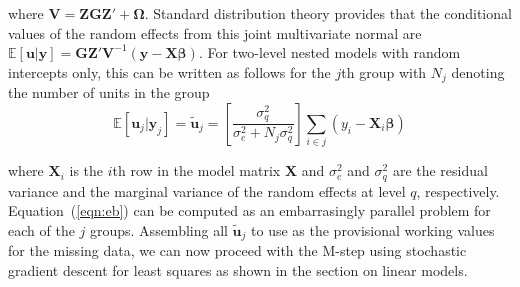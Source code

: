 \documentclass[12pt]{article}
\begin{document}
\noindent where $\bm{V} = \bm{ZGZ'} + \bm{\Omega}$. Standard distribution theory provides that the conditional values of the random effects from this joint multivariate normal are $\mathbb{E}[\bm{u}|\bm{y}]  = \bm{GZ'V}^{-1}(\bm{y}-\bm{X\beta})$. For two-level nested models with random intercepts only, this can be written as follows for the $j$th group with $N_j$ denoting the number of units in the group
\begin{equation}
\label{eqn:eb}
\mathbb{E}[\bm{u}_j|\bm{y}_j] = \bm{\widetilde{u}}_j = \left[\frac{\sigma_{q}^2}{\sigma_{e}^2 + N_{j}\sigma_{q}^2}\right] \sum_{i \in j} \left(y_{i} - \bm{X}_i\bm{\beta}\right)
\end{equation}

\noindent where $\bm{X}_i$ is the $i$th row in the model matrix $\bm{X}$ and $\sigma_{e}^2$ and $\sigma_{q}^2$ are the residual variance and the marginal variance of the random effects at level $q$, respectively. Equation~(\ref{eqn:eb}) can be computed as an embarrasingly parallel problem for each of the $j$ groups. Assembling all $\bm{\widetilde{u}}_j$ to use as the provisional working values for the missing data, we can now proceed with the M-step using stochastic gradient descent for least squares as shown in the section on linear models. 


\clearpage 
 
\end{document}
